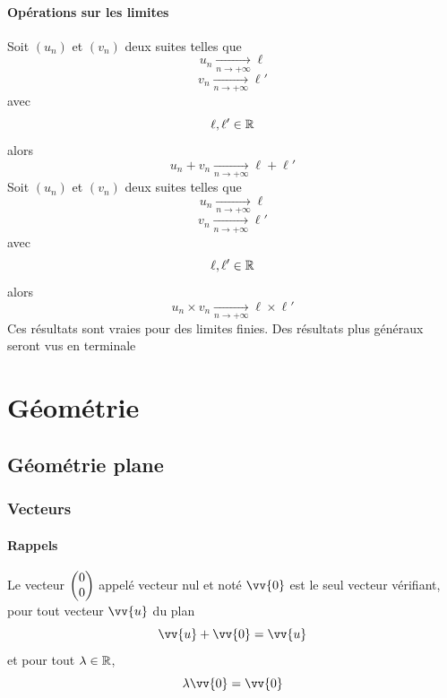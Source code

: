 \subsection{Opérations sur les limites}
Soit $(u_n)$ et $(v_n)$ deux suites telles que 
$$u_n \underset{n\rightarrow+\infty}{\longrightarrow} \ell$$
$$v_n \underset{n\rightarrow+\infty}{\longrightarrow} \ell'$$
avec 
$$\ell,\ell'\in\mathbb{R}$$
alors 
$$u_n + v_n \underset{n\rightarrow+\infty}{\longrightarrow} \ell + \ell'$$
Soit $(u_n)$ et $(v_n)$ deux suites telles que 
$$u_n \underset{n\rightarrow+\infty}{\longrightarrow} \ell$$
$$v_n \underset{n\rightarrow+\infty}{\longrightarrow} \ell'$$
avec 
$$\ell,\ell'\in\mathbb{R}$$
alors 
$$u_n \times v_n \underset{n\rightarrow+\infty}{\longrightarrow} \ell \times \ell'$$
Ces résultats sont vraies pour des limites finies. Des résultats plus généraux seront vus en terminale
\part{Géométrie}
\chapter{Géométrie plane}
\section{Vecteurs}
\subsection{Rappels}
\newline

\newline

 \newline

Le vecteur $\begin{pmatrix}0 \\0 \end{pmatrix}$ appelé vecteur nul et noté $\vv{0}$ est le seul vecteur vérifiant, pour tout vecteur $\vv{u}$ du plan $$\vv{u} + \vv{0} = \vv{u}$$ et pour tout $\lambda \in \mathbb{R}$, $$\lambda \vv{0} = \vv{0}$$


